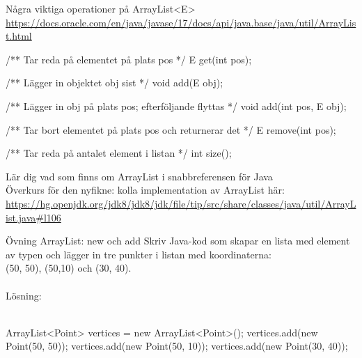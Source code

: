 \begin{Slide}{Några viktiga operationer på ArrayList<E>}
\SlideFontTiny\url{https://docs.oracle.com/en/java/javase/17/docs/api/java.base/java/util/ArrayList.html}
\begin{Code}[numberstyle=,language=Java]
/** Tar reda på elementet på plats pos */
E get(int pos);

/** Lägger in objektet obj sist */
void add(E obj);

/** Lägger in obj på plats pos; efterföljande flyttas */
void add(int pos, E obj);

/** Tar bort elementet på plats pos och returnerar det */
E remove(int pos);

/** Tar reda på antalet element i listan */
int size();
\end{Code}
Lär dig vad som finns om ArrayList i snabbreferensen för Java\\
Överkurs för den nyfikne: kolla implementation av ArrayList här: \\ \url{https://hg.openjdk.org/jdk8/jdk8/jdk/file/tip/src/share/classes/java/util/ArrayList.java#l106}
\end{Slide}


\begin{Slide}{Övning ArrayList: new och add}
Skriv Java-kod som skapar en lista med element av typen  och lägger in tre punkter i listan med koordinaterna:\\ (50, 50), (50,10) och (30, 40).
\pause
~\\~\\ Lösning: \ifkompendium\else\\~\\\fi
\begin{Code}[numberstyle=,language=Java]
ArrayList<Point> vertices = new ArrayList<Point>();
vertices.add(new Point(50, 50));
vertices.add(new Point(50, 10));
vertices.add(new Point(30, 40));
\end{Code}
\end{Slide}


